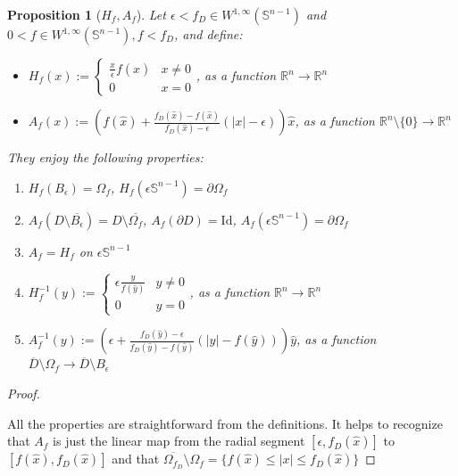 \documentclass[english,a4paper,10pt,oneside]{scrbook}	%
\theoremstyle{break}
\newtheorem{prop}[equation]{Proposition}
\newenvironment{mproof}[1][\proofname]{%
  \begin{proof}[#1]$ $\par\nobreak\ignorespaces
}{%
  \end{proof}
}
\renewcommand*{\proofname}{Proof}
\theoremstyle{remark}
\newcommand{\mR}{\mathbb{R}}
\newcommand{\mS}{\mathbb{S}^{n-1}}
\newcommand{\ds}{\displaystyle}
\newcommand{\id}{\text{Id}}
\newcommand{\xh}{\hat{x}}
\newcommand{\yh}{\hat{y}}
\newcommand{\eps}{\epsilon}
\begin{document}
\begin{prop}[$H_f, A_f$]
Let $\eps <f_D \in W^{1,\infty}(\mS)$ and $0<f \in W^{1,\infty}(\mS), f<f_D$, and define:
\begin{itemize}
	\item $H_f(x):=\ds \left\{\begin{matrix}
\frac{x}{\epsilon}f(\hat{x}) &  x\neq 0\\ 
0 & x=0
\end{matrix}\right. $, as a function $\mR^n\rightarrow \mR^n$
	\item $A_f(x):=\left (  f(\xh)+\frac{f_D(\xh)-f(\xh)}{f_D(\xh)-\eps}(|x|-\eps) \right )\xh$, as a function $\mR^n\setminus\{0\}\rightarrow \mR^n$
\end{itemize}

They enjoy the following properties:

\begin{enumerate}
	\item $H_f(B_\eps)=\Omega_f$, $H_f(\eps \mS) = \partial \Omega_f$
	\item $A_f(D\setminus \overline{B_\eps}) = D\setminus \overline{\Omega_f}$, $A_f(\partial D) = \id$, $A_f(\eps \mS) = \partial \Omega_f$
	\item $A_f=H_f$ on $\eps\mS$
	\item $H_f^{-1}(y):=\ds \left\{\begin{matrix}
\epsilon \frac{y}{f(\hat{y})} &  y\neq 0\\ 
0 & y=0
\end{matrix}\right. $, as a function $\mR^n\rightarrow \mR^n$
	\item $A_f^{-1}(y):=\left (  \eps+\frac{f_D(\yh)-\eps}{f_D(\yh)-f(\yh)}(|y|-f(\yh)) \right )\yh$, as a function $\overline{D}\setminus \Omega_f \rightarrow \overline{D}\setminus B_\eps$
\end{enumerate}

\end{prop}

\begin{mproof}
All the properties are straightforward from the definitions. It helps to recognize that $A_f$ is just the linear map from the radial segment $[\eps, f_D(\xh)]$ to $[f(\xh), f_D(\xh)]$ and that $\overline{\Omega_{f_D}} \setminus \Omega_f = \{f(\xh)\leq|x|\leq f_D(\xh)\}$
\end{mproof}
\end{document}
